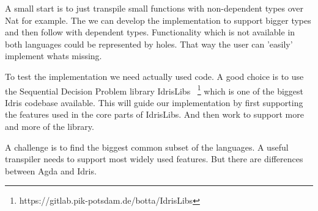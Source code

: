 \documentclass{scrartcl}
\begin{document}
A small start is to just transpile small functions with non-dependent types
over Nat for example. The we can develop the implementation to support bigger
types and then follow with dependent types.  Functionality which is not
available in both languages could be represented by holes. That way the user
can 'easily' implement whats missing.

To test the implementation we need actually used code. A good choice is to use
the Sequential Decision Problem library IdrisLibs
~\footnote{https://gitlab.pik-potsdam.de/botta/IdrisLibs} which is one of the
biggest Idris codebase available. This will guide our implementation by first
supporting the features used in the core parts of IdrisLibs. And then work to
support more and more of the library.

A challenge is to find the biggest common subset of the languages. A useful
transpiler needs to support most widely used features. But there are
differences between Agda and Idris.












\end{document}
